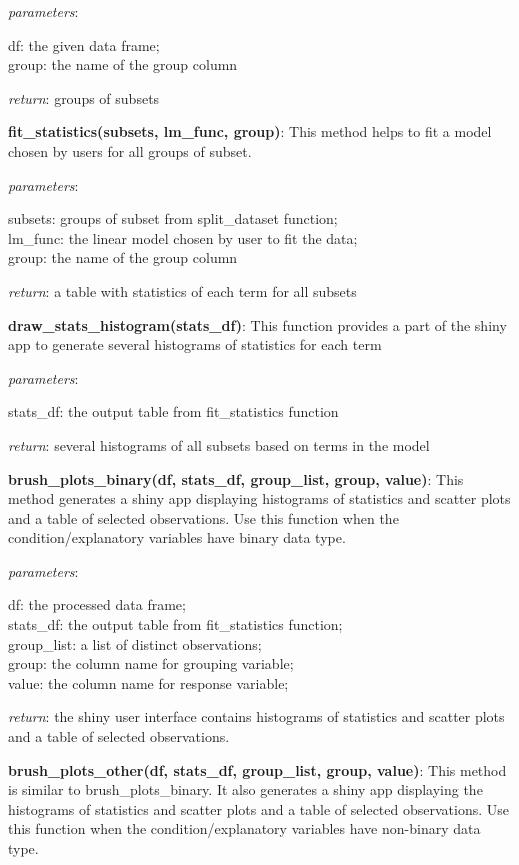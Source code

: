 \documentclass[
]{article}
\begin{document}
\emph{parameters}:

df: the given data frame;\\
group: the name of the group column

\emph{return}: groups of subsets

\textbf{fit\_statistics(subsets, lm\_func, group)}: This method helps to
fit a model chosen by users for all groups of subset.

\emph{parameters}:

subsets: groups of subset from split\_dataset function;\\
lm\_func: the linear model chosen by user to fit the data;\\
group: the name of the group column

\emph{return}: a table with statistics of each term for all subsets

\textbf{draw\_stats\_histogram(stats\_df)}: This function provides a
part of the shiny app to generate several histograms of statistics for
each term

\emph{parameters}:

stats\_df: the output table from fit\_statistics function

\emph{return}: several histograms of all subsets based on terms in the
model

\textbf{brush\_plots\_binary(df, stats\_df, group\_list, group, value)}:
This method generates a shiny app displaying histograms of statistics
and scatter plots and a table of selected observations. Use this
function when the condition/explanatory variables have binary data type.

\emph{parameters}:

df: the processed data frame;\\
stats\_df: the output table from fit\_statistics function;\\
group\_list: a list of distinct observations;\\
group: the column name for grouping variable;\\
value: the column name for response variable;

\emph{return}: the shiny user interface contains histograms of
statistics and scatter plots and a table of selected observations.

\textbf{brush\_plots\_other(df, stats\_df, group\_list, group, value)}:
This method is similar to brush\_plots\_binary. It also generates a
shiny app displaying the histograms of statistics and scatter plots and
a table of selected observations. Use this function when the
condition/explanatory variables have non-binary data type.
\end{document}
